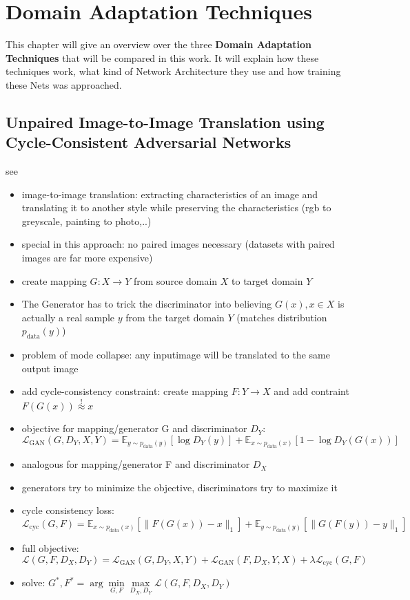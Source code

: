 \chapter{Domain Adaptation Techniques}
\label{sec:techniques}

This chapter will give an overview over the three \textbf{Domain Adaptation Techniques} that will be compared in this work. It will explain how these techniques work, what kind of Network Architecture they use and how training these Nets was approached.


\section{Unpaired Image-to-Image Translation using Cycle-Consistent Adversarial Networks}
see \cite{DBLP:journals/corr/ZhuPIE17}

\begin{itemize}
	\item image-to-image translation: extracting characteristics of an image and translating it to another style while preserving the characteristics (rgb to greyscale, painting to photo,..)
	\item special in this approach: no paired images necessary (datasets with paired images are far more expensive)
	\item create mapping $G: X \rightarrow Y$ from source domain $X$ to target domain $Y$
	\item The Generator has to trick the discriminator into believing $G(x), x \in X$ is actually a real sample $y$ from the target domain $Y$ (matches distribution $p_{\text{data}}(y)$)
	\item problem of mode collapse: any inputimage will be translated to the same output image
	\item add cycle-consistency constraint: create mapping $F: Y \rightarrow X$ and add contraint $F(G(x)) \overset{!}{\approx} x$ 
	\item objective for mapping/generator G and discriminator $D_Y$: \\
	$\mathcal{L}_{\text{GAN}}(G, D_Y, X, Y) = \mathbb{E}_{y\sim p_{\text{data}}(y)}[\log D_Y(y)] + \mathbb{E}_{x\sim p_{\text{data}}(x)}[1 - \log D_Y(G(x))]$
	\item analogous for mapping/generator F and discriminator $D_X$
	\item generators try to minimize the objective, discriminators try to maximize it
	\item cycle consistency loss:\\
	$\mathcal{L}_{\text{cyc}}(G, F) =  \mathbb{E}_{x\sim p_{\text{data}}(x)} [\lVert F(G(x))- x \rVert_1] + \mathbb{E}_{y\sim p_{\text{data}}(y)} [\lVert G(F(y))- y \rVert_1]$
	\item full objective:\\
	$\mathcal{L}(G,F,D_X,D_Y) = \mathcal{L}_{\text{GAN}}(G, D_Y, X, Y) + \mathcal{L}_{\text{GAN}}(F, D_X, Y, X) + \lambda \mathcal{L}_{\text{cyc}}(G, F)$
	\item solve: $G^*, F^* = \arg \underset{G,F}{\min}\underset{D_X, D_Y}{\max} \mathcal{L}(G,F,D_X,D_Y)$
\end{itemize}

